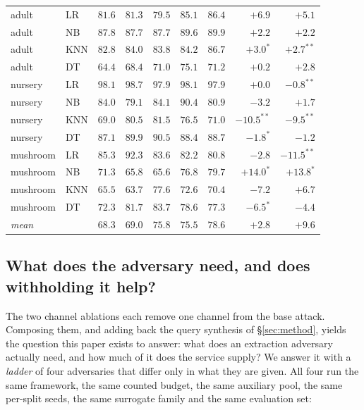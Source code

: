 \documentclass[sigconf,anonymous,review]{acmart}
\begin{document}
\begin{table}[t]
\begin{tabular}{llrrrrrrr}
\addlinespace
adult      & LR   & $81.6$ & $81.3$ & $79.5$ & $85.1$ & $86.4$ & $+6.9$ & $+5.1$ \\
adult      & NB   & $87.8$ & $87.7$ & $87.7$ & $89.6$ & $89.9$ & $+2.2$ & $+2.2$ \\
adult      & KNN  & $82.8$ & $84.0$ & $83.8$ & $84.2$ & $86.7$ & $+3.0^{*}$ & $+2.7^{**}$ \\
adult      & DT   & $64.4$ & $68.4$ & $71.0$ & $75.1$ & $71.2$ & $+0.2$ & $+2.8$ \\
\addlinespace
nursery    & LR   & $98.1$ & $98.7$ & $97.9$ & $98.1$ & $97.9$ & $+0.0$ & $-0.8^{**}$ \\
nursery    & NB   & $84.0$ & $79.1$ & $84.1$ & $90.4$ & $80.9$ & $-3.2$ & $+1.7$ \\
nursery    & KNN  & $69.0$ & $80.5$ & $81.5$ & $76.5$ & $71.0$ & $-10.5^{**}$ & $-9.5^{**}$ \\
nursery    & DT   & $87.1$ & $89.9$ & $90.5$ & $88.4$ & $88.7$ & $-1.8^{*}$ & $-1.2$ \\
\addlinespace
mushroom   & LR   & $85.3$ & $92.3$ & $83.6$ & $82.2$ & $80.8$ & $-2.8$ & $-11.5^{**}$ \\
mushroom   & NB   & $71.3$ & $65.8$ & $65.6$ & $76.8$ & $79.7$ & $+14.0^{*}$ & $+13.8^{*}$ \\
mushroom   & KNN  & $65.5$ & $63.7$ & $77.6$ & $72.6$ & $70.4$ & $-7.2$ & $+6.7$ \\
mushroom   & DT   & $72.3$ & $81.7$ & $83.7$ & $78.6$ & $77.3$ & $-6.5^{*}$ & $-4.4$ \\
\midrule
\multicolumn{2}{l}{\emph{mean}} & $68.3$ & $69.0$ & $75.8$ & $75.5$ & $78.6$ & $+2.8$ & $+9.6$ \\
\bottomrule
\end{tabular}
\end{table}

\subsection{What does the adversary need, and does withholding it help?}
\label{subsec:ladder}
The two channel ablations each remove one channel from the base attack. Composing them, and adding back the query
synthesis of \S\ref{sec:method}, yields the question this paper exists to answer: what does an
extraction adversary actually need, and how much of it does the service supply? We answer it with a
\emph{ladder} of four adversaries that differ only in what they are given. All four run the same
framework, the same counted budget, the same auxiliary pool, the same per-split seeds, the same
surrogate family and the same evaluation set:
\end{document}
